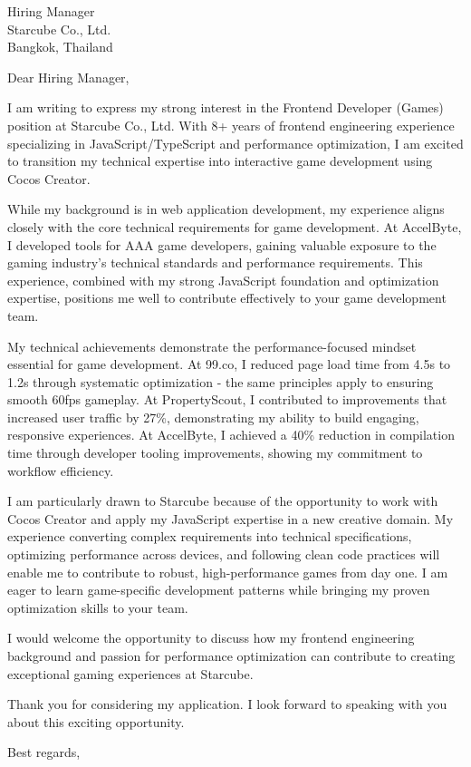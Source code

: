 \documentclass[11pt]{letter}
\begin{document}
\begin{letter}{
  Hiring Manager \\
  Starcube Co., Ltd. \\
  Bangkok, Thailand
}

\opening{Dear Hiring Manager,}
I am writing to express my strong interest in the Frontend Developer (Games) position at Starcube Co., Ltd. With 8+ years of frontend engineering experience specializing in JavaScript/TypeScript and performance optimization, I am excited to transition my technical expertise into interactive game development using Cocos Creator.

While my background is in web application development, my experience aligns closely with the core technical requirements for game development. At AccelByte, I developed tools for AAA game developers, gaining valuable exposure to the gaming industry's technical standards and performance requirements. This experience, combined with my strong JavaScript foundation and optimization expertise, positions me well to contribute effectively to your game development team.

My technical achievements demonstrate the performance-focused mindset essential for game development. At 99.co, I reduced page load time from 4.5s to 1.2s through systematic optimization - the same principles apply to ensuring smooth 60fps gameplay. At PropertyScout, I contributed to improvements that increased user traffic by 27\%, demonstrating my ability to build engaging, responsive experiences. At AccelByte, I achieved a 40\% reduction in compilation time through developer tooling improvements, showing my commitment to workflow efficiency.

I am particularly drawn to Starcube because of the opportunity to work with Cocos Creator and apply my JavaScript expertise in a new creative domain. My experience converting complex requirements into technical specifications, optimizing performance across devices, and following clean code practices will enable me to contribute to robust, high-performance games from day one. I am eager to learn game-specific development patterns while bringing my proven optimization skills to your team.

I would welcome the opportunity to discuss how my frontend engineering background and passion for performance optimization can contribute to creating exceptional gaming experiences at Starcube.

Thank you for considering my application. I look forward to speaking with you about this exciting opportunity.

\closing{Best regards,}

\end{letter}
\end{document}
